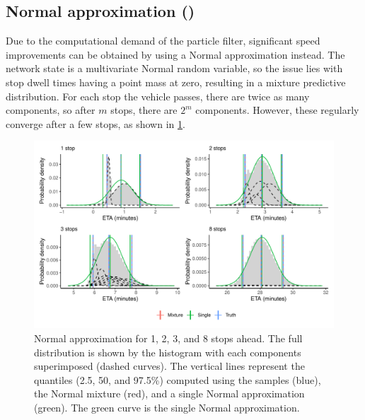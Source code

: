 \subsection[Normal approximation]{Normal approximation (\Fnorm{})}
\label{sec:prediction_arrival_time_normal}

Due to the computational demand of the particle filter, significant speed improvements can be obtained by using a Normal approximation instead. The network state is a multivariate Normal random variable, so the issue lies with stop dwell times having a point mass at zero, resulting in a mixture predictive distribution. For each stop the vehicle passes, there are twice as many components, so after $m$ stops, there are $2^m$ components. However, these regularly converge after a few stops, as shown in \cref{fig:normal_approx}.

\begin{knitrout}\small
{}\color{fgcolor}\begin{figure}

{\centering \includegraphics[width=\textwidth]{figure/normal_approx-1} 

}

\caption[Normal approximation for 1, 2, 3, and 8 stops ahead]{Normal approximation for 1, 2, 3, and 8 stops ahead. The full distribution is shown by the histogram with each components superimposed (dashed curves). The vertical lines represent the quantiles (2.5, 50, and 97.5\%) computed using the samples (blue), the Normal mixture (red), and a single Normal approximation (green). The green curve is the single Normal approximation.}\label{fig:normal_approx}
\end{figure}


\end{knitrout}

